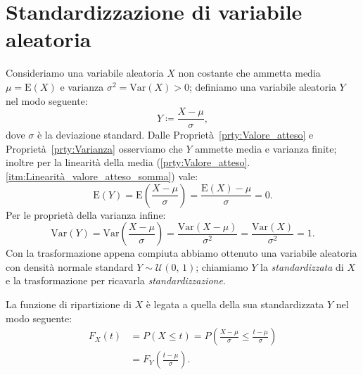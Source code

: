     \section{Standardizzazione di variabile aleatoria}
        \begin{defn}
            Consideriamo una variabile aleatoria $X$ non costante che ammetta media $\mu = \text{E}(X)$ e varianza $\sigma^2 = \text{Var}(X) > 0$; definiamo una variabile aleatoria $Y$ nel modo seguente:
            \begin{equation}\label{eq:Standardizzazione}
                Y \coloneqq \frac{X-\mu}{\sigma}
            ,\end{equation}
            dove $\sigma$ è la deviazione standard. Dalle Proprietà~\ref{prty:Valore_atteso} e Proprietà~\ref{prty:Varianza} osserviamo che $Y$ ammette media e varianza finite; inoltre per la linearità della media (\ref{prty:Valore_atteso}.\ref{itm:Linearità_valore_atteso_somma}) vale: \[
                \text{E}(Y) = \text{E}\left(\frac{X - \mu}{\sigma}\right) = \frac{\text{E}(X) - \mu}{\sigma} = 0
            .\] Per le proprietà della varianza infine: \[
            \text{Var}(Y) = \text{Var}\left(\frac{X - \mu}{\sigma}\right) = \frac{\text{Var}(X - \mu)}{\sigma^2} = \frac{\text{Var}(X)}{\sigma^2} = 1
        .\] Con la trasformazione appena compiuta abbiamo ottenuto una variabile aleatoria con densità normale standard $Y \sim \mathcal{U}(0,\,1)$; chiamiamo $Y$ la \emph{standardizzata} di $X$ e la trasformazione per ricavarla \emph{standardizzazione}.
        \end{defn}
        \begin{obsv}
            La funzione di ripartizione di $X$ è legata a quella della sua standardizzata $Y$ nel modo seguente:
            \begin{align*}
                F_X(t) &= P(X \leq t) = P\left(\frac{X - \mu}{\sigma} \leq \frac{t - \mu}{\sigma}\right) \\
                       &= F_Y\left(\frac{t - \mu}{\sigma}\right)
            .\end{align*}
        \end{obsv}

